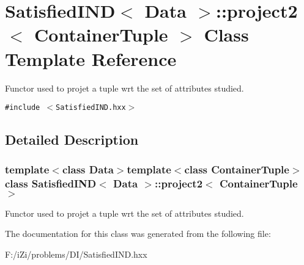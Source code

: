 \section{Satisfied\-IND$<$ Data $>$::project2$<$ Container\-Tuple $>$ Class Template Reference}
\label{class_satisfied_i_n_d_1_1project2}
Functor used to projet a tuple wrt the set of attributes studied.  


{\tt \#include $<$Satisfied\-IND.hxx$>$}



\subsection{Detailed Description}
\subsubsection*{template$<$class Data$>$template$<$class Container\-Tuple$>$ class Satisfied\-IND$<$ Data $>$::project2$<$ Container\-Tuple $>$}

Functor used to projet a tuple wrt the set of attributes studied. 



The documentation for this class was generated from the following file:\begin{CompactItemize}
\item 
F:/i\-Zi/problems/DI/Satisfied\-IND.hxx\end{CompactItemize}

